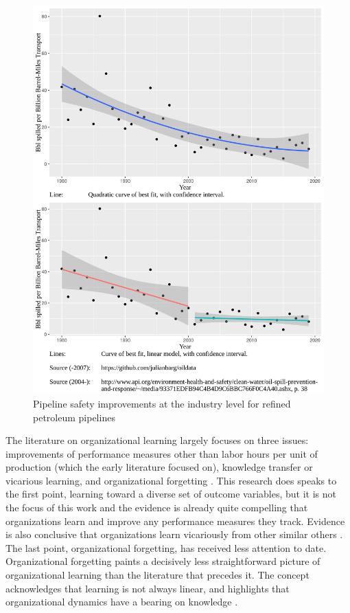 \begin{figure}
	\caption{Pipeline safety improvements at the industry level for refined petroleum pipelines}
	\centerline{\includegraphics{../illustrations/population_learning_6.png}}
\end{figure}

The literature on organizational learning largely focuses on three issues: improvements of performance measures other than labor hours per unit of production (which the early literature focused on), knowledge transfer or vicarious learning, and organizational forgetting \citep{Argote2013-1}. This research does speaks to the first point, learning toward a diverse set of outcome variables, but it is not the focus of this work and the evidence is already quite compelling that organizations learn and improve any performance measures they track. Evidence is also conclusive that organizations learn vicariously from other similar others \citep{Kim2007}. The last point, organizational forgetting, has received less attention to date. Organizational forgetting paints a decisively less straightforward picture of organizational learning than the literature that precedes it. The concept acknowledges that learning is not always linear, and highlights that organizational dynamics have a bearing on knowledge \citep{Argote2013-3}.

